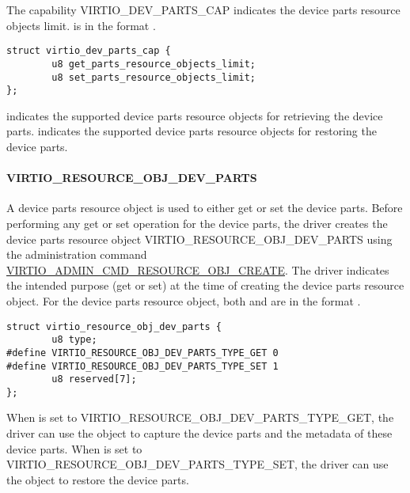 The capability VIRTIO_DEV_PARTS_CAP indicates the device parts resource objects limit.
 is in the format .

\begin{lstlisting}
struct virtio_dev_parts_cap {
        u8 get_parts_resource_objects_limit;
        u8 set_parts_resource_objects_limit;
};
\end{lstlisting}

 indicates the supported device parts
resource objects for retrieving the device parts.
 indicates the supported device parts
resource objects for restoring the device parts.

\paragraph{VIRTIO_RESOURCE_OBJ_DEV_PARTS}\label{par:Basic Facilities of a Virtio Device / Device groups / Group administration commands / Device parts / VIRTIO_RESOURCE_OBJ_DEV_PARTS}

A device parts resource object is used to either get or set the device parts.
Before performing any get or set operation for the device parts, the driver
creates the device parts resource object
VIRTIO_RESOURCE_OBJ_DEV_PARTS using the administration command
\hyperref[par:Basic Facilities of a Virtio Device / Device groups / Group administration commands / Device resource objects / VIRTIO_ADMIN_CMD_RESOURCE_OBJ_CREATE]{VIRTIO_ADMIN_CMD_RESOURCE_OBJ_CREATE}.
The driver indicates the intended purpose (get or set) at the time of creating the
device parts resource object.
For the device parts resource object, both  and
 are in the format
.

\begin{lstlisting}
struct virtio_resource_obj_dev_parts {
        u8 type;
#define VIRTIO_RESOURCE_OBJ_DEV_PARTS_TYPE_GET 0
#define VIRTIO_RESOURCE_OBJ_DEV_PARTS_TYPE_SET 1
        u8 reserved[7];
};
\end{lstlisting}

When  is set to VIRTIO_RESOURCE_OBJ_DEV_PARTS_TYPE_GET,
the driver can use the object to capture the device parts and the metadata of
these device parts. When  is set to
VIRTIO_RESOURCE_OBJ_DEV_PARTS_TYPE_SET, the driver can use the
object to restore the device parts.

